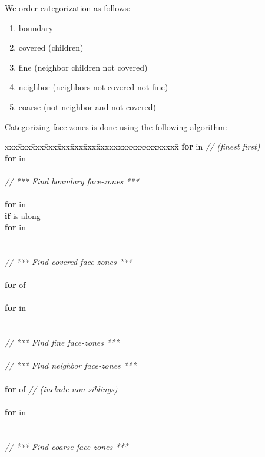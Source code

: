 \documentclass[10pt]{article}
\begin{document}
We order categorization as follows:

\begin{enumerate}
\item boundary
\item covered (children)
\item fine (neighbor children not covered)
\item neighbor (neighbors not covered not fine)
\item coarse (not neighbor and not covered)
\end{enumerate}




Categorizing face-zones is done using the following algorithm:

\begin{tabbing}
xxx\=xxx\=xxx\=xxx\=xxx\=xxx\=xxx\=xxxxxxxxxxxxxxxxxxx\=\kill
\> \textbf{for}  in  \textit{// (finest first)}\\
\>\> \textbf{for}  in  \\
\\
\>\>\> \textit{// *** Find boundary face-zones ***} \\
\\
\>\>\> \textbf{for}  in  \\
\>\>\>\>   \textbf{if}  is along  \\
\>\>\>\>\>   \textbf{for}  in  \\
\>\>\>\>\>\>      \\
\\
\>\>\> \textit{// *** Find covered face-zones ***} \\
\\
\>\>\> \textbf{for}  of  \\
\>\>\>\>  \\
\>\>\>\> \textbf{for}  in  \\
\>\>\>\>\>      \\
\\
\>\>\> \textit{// *** Find fine face-zones ***} \\
\\
\>\>\> \textit{// *** Find neighbor face-zones ***} \\
\\
\>\>\> \textbf{for}  of  \textit {// (include non-siblings)}\\
\>\>\>\>  \\
\>\>\>\> \textbf{for}  in  \\
\>\>\>\>\>      \\
\\
\>\>\> \textit{// *** Find coarse face-zones ***} \\
\end{tabbing}
\end{document}
